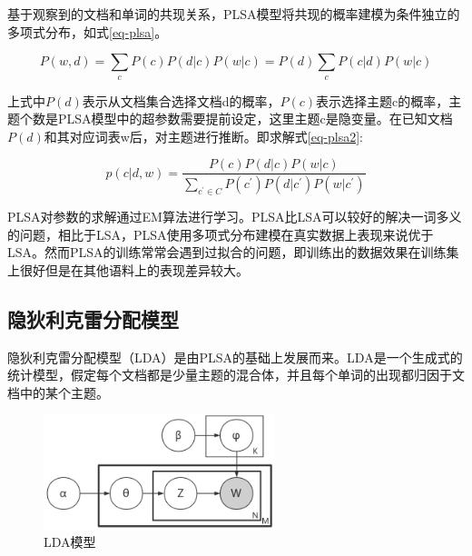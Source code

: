 \documentclass[winfonts,master,oneside,nobackinfo]{njuthesis}
\begin{document}
基于观察到的文档和单词的共现关系，PLSA模型将共现的概率建模为条件独立的多项式分布，如式\ref{eq-plsa}。


\begin{equation}
P ( w , d ) = \sum _ { c } P ( c ) P ( d | c ) P ( w | c ) = P ( d ) \sum _ { c } P ( c | d ) P ( w | c )
\label{eq-plsa}
\end{equation}


上式中$P ( d )$表示从文档集合选择文档d的概率，$P ( c )$表示选择主题c的概率，主题个数是PLSA模型中的超参数需要提前设定，这里主题c是隐变量。在已知文档$P ( d )$和其对应词表w后，对主题进行推断。即求解式\ref{eq-plsa2}:

\begin{equation}
p ( c | d , w ) = \frac { P ( c ) P ( d | c ) P ( w | c ) } { \sum _ { c ^ { \prime } \in C } P \left( c ^ { \prime } \right) P ( d | c ^ { \prime } ) P ( w | c ^ { \prime } ) }
\label{eq-plsa2}
\end{equation}

PLSA对参数的求解通过EM算法进行学习。PLSA比LSA可以较好的解决一词多义的问题，相比于LSA，PLSA使用多项式分布建模在真实数据上表现来说优于LSA。然而PLSA的训练常常会遇到过拟合的问题，即训练出的数据效果在训练集上很好但是在其他语料上的表现差异较大。

\subsection{隐狄利克雷分配模型}

隐狄利克雷分配模型（LDA）是由PLSA的基础上发展而来。LDA是一个生成式的统计模型，假定每个文档都是少量主题的混合体，并且每个单词的出现都归因于文档中的某个主题。

\begin{figure}[h]
\centering
\includegraphics[width=0.6\textwidth]{./figure/lda.jpg}
\caption{LDA模型}
\label{lda}
\end{figure}
\end{document}
